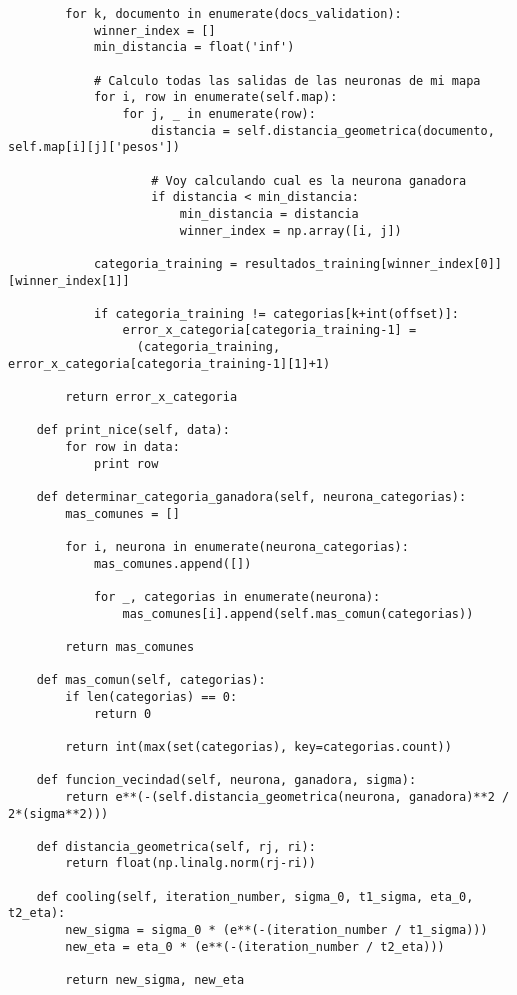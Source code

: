 \begin{changemargin}{-2.0cm}{-1.5cm}
\begin{verbatim}
        for k, documento in enumerate(docs_validation):
            winner_index = []
            min_distancia = float('inf')

            # Calculo todas las salidas de las neuronas de mi mapa
            for i, row in enumerate(self.map):
                for j, _ in enumerate(row):
                    distancia = self.distancia_geometrica(documento, self.map[i][j]['pesos'])

                    # Voy calculando cual es la neurona ganadora
                    if distancia < min_distancia:
                        min_distancia = distancia
                        winner_index = np.array([i, j])

            categoria_training = resultados_training[winner_index[0]][winner_index[1]]

            if categoria_training != categorias[k+int(offset)]:
                error_x_categoria[categoria_training-1] = 
                  (categoria_training, error_x_categoria[categoria_training-1][1]+1)

        return error_x_categoria

    def print_nice(self, data):
        for row in data:
            print row

    def determinar_categoria_ganadora(self, neurona_categorias):
        mas_comunes = []

        for i, neurona in enumerate(neurona_categorias):
            mas_comunes.append([])
            
            for _, categorias in enumerate(neurona):
                mas_comunes[i].append(self.mas_comun(categorias))

        return mas_comunes
                
    def mas_comun(self, categorias):
        if len(categorias) == 0:
            return 0

        return int(max(set(categorias), key=categorias.count))

    def funcion_vecindad(self, neurona, ganadora, sigma):
        return e**(-(self.distancia_geometrica(neurona, ganadora)**2 / 2*(sigma**2)))

    def distancia_geometrica(self, rj, ri):
        return float(np.linalg.norm(rj-ri))

    def cooling(self, iteration_number, sigma_0, t1_sigma, eta_0, t2_eta):
        new_sigma = sigma_0 * (e**(-(iteration_number / t1_sigma)))
        new_eta = eta_0 * (e**(-(iteration_number / t2_eta)))

        return new_sigma, new_eta
\end{verbatim}
\end{changemargin}

